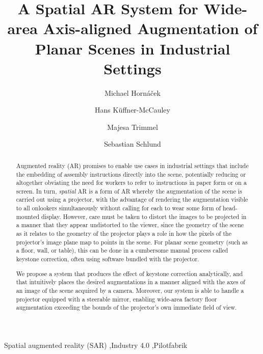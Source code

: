 \documentclass[review]{elsarticle}
\begin{document}
\begin{frontmatter}

\title{A Spatial AR System for Wide-area Axis-aligned Augmentation of Planar Scenes in Industrial Settings} %

\author{Michael Horn\'{a}\v{c}ek}
\author{Hans K\"{u}ffner-McCauley}
\author{Majesa Trimmel}
\author{Sebastian Schlund}
\address{Human Centered Cyber Physical Production and Assembly Systems, Institute for Management Sciences, TU Vienna, Austria}

\begin{abstract}
Augmented reality (AR) promises to enable use cases in industrial settings that include the embedding of assembly instructions directly into the scene, potentially reducing or altogether obviating the need for workers to refer to instructions in paper form or on a screen. In turn, \textit{spatial} AR is a form of AR whereby the augmentation of the scene is carried out using a projector, with the advantage of rendering the augmentation visible to all onlookers simultaneously without calling for each to wear some form of head-mounted display. However, care must be taken to distort the images to be projected in a manner that they appear undistorted to the viewer, since the geometry of the scene as it relates to the geometry of the projector plays a role in how the pixels of the projector's image plane map to points in the scene. For planar scene geometry (such as a floor, wall, or table), this can be done in a cumbersome manual process called keystone correction, often using software bundled with the projector.

We propose a system that produces the effect of keystone correction analytically, and that intuitively places the desired augmentations in a manner aligned with the axes of an image of the scene acquired by a camera. Moreover, our system is able to handle a projector equipped with a steerable mirror, enabling wide-area factory floor augmentation exceeding the bounds of the projector's own immediate field of view.
\end{abstract}

\begin{keyword}
Spatial augmented reality (SAR) \sep Industry 4.0 \sep Pilotfabrik
\end{keyword}

\end{frontmatter}
\end{document}
